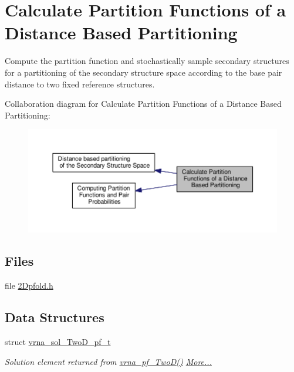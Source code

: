 \hypertarget{group__kl__neighborhood__pf}{\section{Calculate Partition Functions of a Distance Based Partitioning}
\label{group__kl__neighborhood__pf}
}


Compute the partition function and stochastically sample secondary structures for a partitioning of the secondary structure space according to the base pair distance to two fixed reference structures.  


Collaboration diagram for Calculate Partition Functions of a Distance Based Partitioning\-:
\nopagebreak
\begin{figure}[H]
\begin{center}
\leavevmode
\includegraphics[width=350pt]{group__kl__neighborhood__pf}
\end{center}
\end{figure}
\subsection*{Files}
\begin{DoxyCompactItemize}
\item 
file \hyperlink{2Dpfold_8h}{2\-Dpfold.\-h}
\end{DoxyCompactItemize}
\subsection*{Data Structures}
\begin{DoxyCompactItemize}
\item 
struct \hyperlink{group__kl__neighborhood__pf_structvrna__sol__TwoD__pf__t}{vrna\-\_\-sol\-\_\-\-Two\-D\-\_\-pf\-\_\-t}
\begin{DoxyCompactList}\small\item\em Solution element returned from \hyperlink{group__kl__neighborhood__pf_ga0bc3427689bd09da09b8b3094a27f836}{vrna\-\_\-pf\-\_\-\-Two\-D()}  \hyperlink{group__kl__neighborhood__pf_structvrna__sol__TwoD__pf__t}{More...}\end{DoxyCompactList}\end{DoxyCompactItemize}
